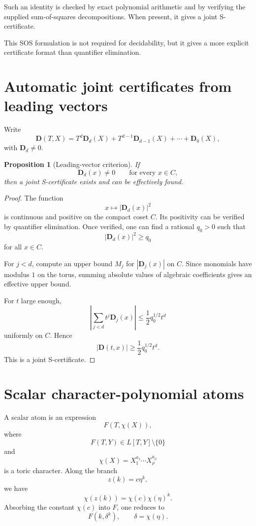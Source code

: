 \documentclass[11pt]{article}
\newtheorem{proposition}[theorem]{Proposition}
\begin{document}
Such an identity is checked by exact polynomial arithmetic and by verifying the supplied sum-of-squares decompositions. When present, it gives a joint S-certificate.

This SOS formulation is not required for decidability, but it gives a more explicit certificate format than quantifier elimination.

\section{Automatic joint certificates from leading vectors}

Write
\[
\mathbf D(T,X)=T^d\mathbf D_d(X)+T^{d-1}\mathbf D_{d-1}(X)+\cdots+\mathbf D_0(X),
\]
with \(\mathbf D_d\ne0\).

\begin{proposition}[Leading-vector criterion]
If
\[
\mathbf D_d(x)\ne0
\qquad\text{for every }x\in C,
\]
then a joint S-certificate exists and can be effectively found.
\end{proposition}

\begin{proof}
The function
\[
x\mapsto |\mathbf D_d(x)|^2
\]
is continuous and positive on the compact coset \(C\). Its positivity can be verified by quantifier elimination. Once verified, one can find a rational \(q_0>0\) such that
\[
|\mathbf D_d(x)|^2\ge q_0
\]
for all \(x\in C\).

For \(j<d\), compute an upper bound \(M_j\) for \(|\mathbf D_j(x)|\) on \(C\). Since monomials have modulus \(1\) on the torus, summing absolute values of algebraic coefficients gives an effective upper bound.

For \(t\) large enough,
\[
\left|\sum_{j<d}t^j\mathbf D_j(x)\right|
\le
\frac12q_0^{1/2}t^d
\]
uniformly on \(C\). Hence
\[
|\mathbf D(t,x)|\ge \frac12q_0^{1/2}t^d.
\]
This is a joint S-certificate.
\end{proof}

\section{Scalar character-polynomial atoms}

A scalar atom is an expression
\[
F(T,\chi(X)),
\]
where
\[
F(T,Y)\in L[T,Y]\setminus\{0\}
\]
and
\[
\chi(X)=X_1^{a_1}\cdots X_\rho^{a_\rho}
\]
is a toric character. Along the branch
\[
z(k)=c\eta^k,
\]
we have
\[
\chi(z(k))=\chi(c)\chi(\eta)^k.
\]
Absorbing the constant \(\chi(c)\) into \(F\), one reduces to
\[
F(k,\delta^k),
\qquad
\delta=\chi(\eta).
\]
\end{document}
